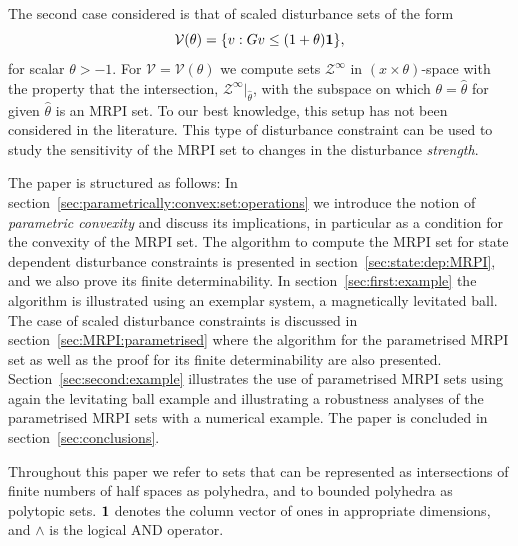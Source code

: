 \documentclass[letterpaper, 10pt, conference]{ieeeconf} %
\begin{document}
The second case considered is that of scaled disturbance sets of the form
\begin{equation}
  \mathcal V(\theta) = \{v:Gv\leq(1+\theta){\bf{1}}\},
\end{equation}
for scalar $\theta>-1$. For $\mathscr V = \mathcal V(\theta)$ we compute sets $\mathcal Z^\infty$ in 
$(x\times\theta)$-space with the property that 
the intersection, $\mathcal Z^\infty\vert_{\hat\theta}$, with the subspace on which $\theta=\hat\theta$ 
for given $\hat\theta$ is an MRPI set. To our best knowledge, this setup has not been 
considered in the literature. This type of disturbance constraint can be used to study the sensitivity of
the MRPI set to changes in the disturbance \emph{strength}.

The paper is structured as follows: In section~\ref{sec:parametrically:convex:set:operations} we
introduce the notion of \emph{parametric convexity} and discuss its implications, in particular as a condition 
for the convexity of the MRPI set. The algorithm to compute the MRPI set for state dependent disturbance
constraints is presented in section~\ref{sec:state:dep:MRPI}, and we also prove its finite determinability.
In section~\ref{sec:first:example} the algorithm is illustrated using an exemplar system, a magnetically 
levitated ball. The case of scaled disturbance constraints is discussed in section~\ref{sec:MRPI:parametrised}
where the algorithm for the parametrised MRPI set as well as the proof for its finite determinability
are also presented. Section~\ref{sec:second:example} illustrates the use of parametrised MRPI sets using
again the levitating ball example and illustrating a robustness analyses of the parametrised
MRPI sets with a numerical example. The paper is concluded in section~\ref{sec:conclusions}.

Throughout this paper we refer to sets that can be represented as intersections of finite numbers of half 
spaces as polyhedra, and to bounded polyhedra as polytopic sets. ${\bf{1}}$ denotes the column vector of 
ones in appropriate dimensions, and $\wedge$ is the logical AND operator. 
%
%
%
\end{document}
